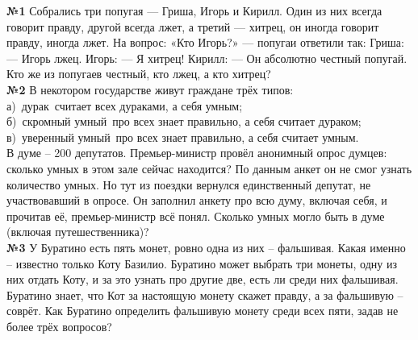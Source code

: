 \documentclass[12 pt, a4paper]{article}%
\newcommand{\task}[1]{{{\vspace{0.6cm} \vspace{-2ex} \textbf{№{#1}}  }}}
\begin{document}
	\large
	\raggedright
	
	\task{1} Собрались три попугая — Гриша, Игорь и Кирилл. Один из них всегда говорит правду, другой всегда лжет, а третий — хитрец, он иногда говорит правду, иногда лжет. На вопрос: «Кто Игорь?» — попугаи ответили так: Гриша: — Игорь лжец. Игорь: — Я хитрец! Кирилл: — Он абсолютно честный попугай. Кто же из попугаев честный, кто лжец, а кто хитрец?\\
	
	\task{2} В некотором государстве живут граждане трёх типов:\\
	а) дурак считает всех дураками, а себя умным;\\
	б) скромный умный про всех знает правильно, а себя считает дураком;\\
	в) уверенный умный про всех знает правильно, а себя считает умным.\\ В думе – 200 депутатов. Премьер-министр провёл анонимный опрос думцев: сколько умных в этом зале сейчас находится? По данным анкет он не смог узнать количество умных. Но тут из поездки вернулся единственный депутат, не участвовавший в опросе. Он заполнил анкету про всю думу, включая себя, и прочитав её, премьер-министр всё понял. Сколько умных могло быть в думе (включая путешественника)?\\
	
	\task{3} У Буратино есть пять монет, ровно одна из них – фальшивая. Какая именно – известно только Коту Базилио. Буратино может выбрать три монеты, одну из них отдать Коту, и за это узнать про другие две, есть ли среди них фальшивая. Буратино знает, что Кот за настоящую монету скажет правду, а за фальшивую – соврёт. Как Буратино определить фальшивую монету среди всех пяти, задав не более трёх вопросов?
	
\end{document}
